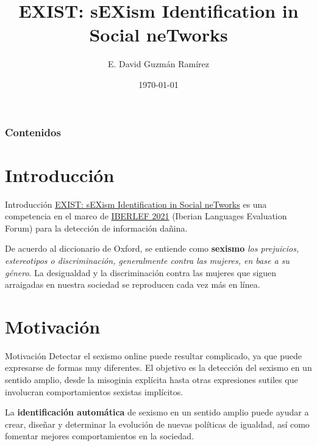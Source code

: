 \documentclass[10pt]{beamer}
\title[Shared Task at IberLEF 2021]{EXIST: sEXism Identification in Social neTworks} %
\author[David Guzmán]{E. David Guzmán Ramírez} %
\institute[IIMAS, UNAM] %
{	Licenciatura en Ciencia de Datos \\
	Minería de Textos \\ \medskip Dra. Helena Gómez Adorno \\ M. en C. Ricardo Montalvo Lezama}
\date{{\tiny \today}} %
\begin{document}
	
	
\begin{frame}
	\titlepage %
\end{frame}

\begin{frame}
\frametitle{Contenidos}
\justify

\tableofcontents
\end{frame}

\section{Introducción}
\begin{frame}{Introducción}
\justify
\small
\href{http://nlp.uned.es/exist2021/}{EXIST: sEXism Identification in Social neTworks} es una competencia en el marco de \href{https://sites.google.com/view/iberlef2021/home}{IBERLEF 2021} (Iberian Languages Evaluation Forum) para la detección de información dañina. \medskip

De acuerdo al diccionario de Oxford, se entiende como \textbf{sexismo} \emph{los prejuicios, estereotipos o discriminación, generalmente contra las mujeres, en base a su género}. La desigualdad y la discriminación contra las mujeres que siguen arraigadas en nuestra sociedad se reproducen cada vez más en línea. \medskip

\end{frame}


\section{Motivación}
\begin{frame}{Motivación}
\justify
\small
Detectar el sexismo online puede resultar complicado, ya que puede expresarse de formas muy diferentes. El objetivo es la detección del sexismo en un sentido amplio, desde la misoginia explícita hasta otras expresiones sutiles que involucran comportamientos sexistas implícitos. \medskip

La \textbf{identificación automática} de sexismo en un sentido amplio puede ayudar a crear, diseñar y determinar la evolución de nuevas políticas de igualdad, así como fomentar mejores comportamientos en la sociedad.
\end{frame}
\end{document}
